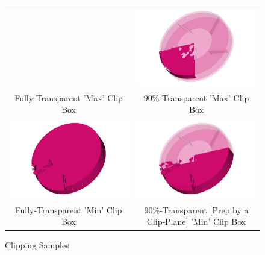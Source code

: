 \documentclass[letterpaper,12pt]{article}
\begin{document}
\begin{figure}[!h!tbp]
\begin{center}
\begin{tabular}{ c c }
 & \includegraphics[scale=0.263157894737]{./Figures/90-TransparentMaxClipBox.png}
 \\ Fully-Transparent 'Max' Clip Box & 90\%-Transparent 'Max' Clip Box \\
\includegraphics[scale=0.263157894737]{./Figures/Fully-TransparentMinClipBox.png}
 & \includegraphics[scale=0.263157894737]{./Figures/90-TransparentPrepMinClipBox.png}
 \\ Fully-Transparent 'Min' Clip Box & 90\%-Transparent [Prep by a Clip-Plane] 'Min' Clip Box \\
\end{tabular}
\caption{\label{fig:clp}
Clipping Samples}
\end{center}
\end{figure}
\vfill
\newpage
\clearpage
\end{document}
